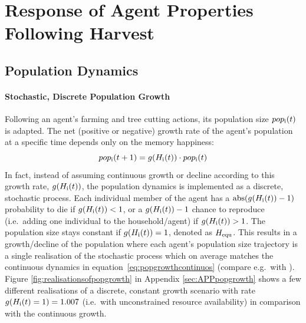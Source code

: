 \section{Response of Agent Properties Following Harvest}\label{sec:Reaction} 
\subsection{Population Dynamics}
\paragraph{Stochastic, Discrete Population Growth}
Following an agent's farming and tree cutting actions, its population size $pop_{\rm i}(t)$ is adapted. 
The net (positive or negative) growth rate of the agent's population at a specific time depends only on the memory happiness:
\begin{equation}\label{eq:popgrowthcontinuos}
pop_{\rm i}(t+1) = g(H_{\rm i}(t)) \cdot pop_{\rm i}(t)
\end{equation}
In fact, instead of assuming continuous growth or decline according to this growth rate, $g(H_{\rm i}(t))$, the population dynamics is implemented as a discrete, stochastic process.
Each individual member of the agent has a ${\rm abs}(g(H_{\rm i}(t))-1)$ probability to die if $g(H_{\rm i}(t))<1$, or a $g(H_{\rm i}(t))-1$ chance to reproduce (i.e.\ adding one individual to the household/agent) if $g(H_{\rm i}(t))>1$.
The population size stays constant if $g(H_{\rm i}(t))=1$, denoted as $H_{\rm equ}$. 
This results in a growth/decline of the population where each agent's population size trajectory is a single realisation of the stochastic process which on average matches the continuous dynamics in equation~\ref{eq:popgrowthcontinuos} (compare e.g.\ with \cite{Bungartz2009}).
Figure \ref{fig:realisationsofpopgrowth} in Appendix \ref{sec:APPpopgrowth} shows a few different realisations of a discrete, constant growth scenario with rate $g(H_{\rm i}(t)=1)=1.007$ (i.e.\ with unconstrained resource availability) in comparison with the continuous growth.

